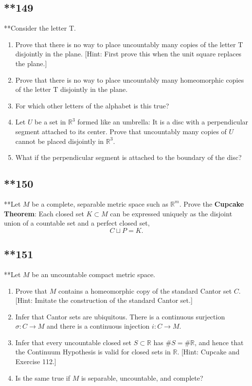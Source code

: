 \documentclass{amsart}
\begin{document}
\subsection*{**149}
**Consider the letter T.
\begin{enumerate}[label=(\alph*)]
\item Prove that there is no way to place uncountably many copies of the letter T disjointly in the plane. [Hint: First prove this when the unit square replaces the plane.]
\item Prove that there is no way to place uncountably many homeomorphic copies of the letter T disjointly in the plane.
\item For which other letters of the alphabet is this true?
\item Let $U$ be a set in $\mathbb{R}^3$ formed like an umbrella: It is a disc with a perpendicular segment attached to its center. Prove that uncountably many copies of $U$ cannot be placed disjointly in $\mathbb{R}^3$.
\item What if the perpendicular segment is attached to the boundary of the disc?
\end{enumerate}

\subsection*{**150}
**Let $M$ be a complete, separable metric space such as $\mathbb{R}^m$. Prove the \textbf{Cupcake Theorem}: Each closed set $K \subset M$ can be expressed uniquely as the disjoint union of a countable set and a perfect closed set,
\[
C \sqcup P = K.
\]

\subsection*{**151}
**Let $M$ be an uncountable compact metric space.
\begin{enumerate}[label=(\alph*)]
\item Prove that $M$ contains a homeomorphic copy of the standard Cantor set $C$. [Hint: Imitate the construction of the standard Cantor set.]
\item Infer that Cantor sets are ubiquitous. There is a continuous surjection $\sigma : C \to M$ and there is a continuous injection $i : C \to M$.
\item Infer that every uncountable closed set $S \subset \mathbb{R}$ has $\#S = \#\mathbb{R}$, and hence that the Continuum Hypothesis is valid for closed sets in $\mathbb{R}$. [Hint: Cupcake and Exercise 112.]
\item Is the same true if $M$ is separable, uncountable, and complete?
\end{enumerate}
\end{document}
